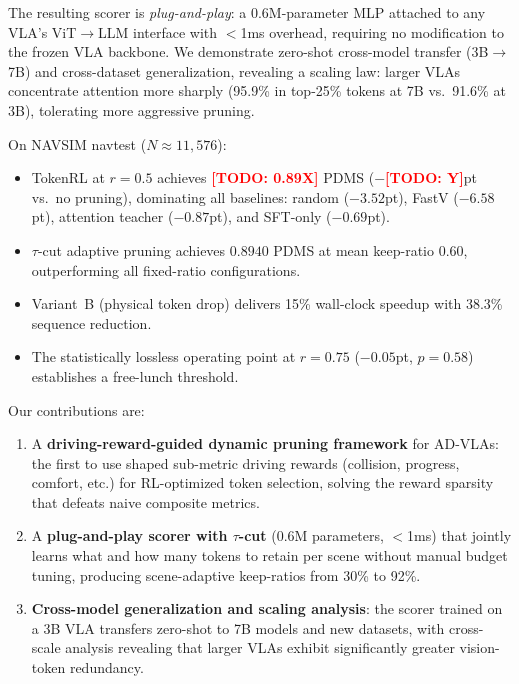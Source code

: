 \documentclass[letterpaper]{article} %
\newcommand{\ours}{TokenRL}
\newcommand{\todo}[1]{\textcolor{red}{\textbf{[TODO: #1]}}}
\begin{document}
The resulting scorer is \emph{plug-and-play}: a 0.6M-parameter MLP attached to any VLA's ViT$\to$LLM interface with $<$1ms overhead, requiring no modification to the frozen VLA backbone.
We demonstrate zero-shot cross-model transfer (3B$\to$7B) and cross-dataset generalization, revealing a scaling law: larger VLAs concentrate attention more sharply (95.9\% in top-25\% tokens at 7B vs.\ 91.6\% at 3B), tolerating more aggressive pruning.

On NAVSIM navtest ($N{\approx}11{,}576$):
\begin{itemize}[nosep,leftmargin=*]
\item \ours{} at $r{=}0.5$ achieves \todo{0.89X} PDMS ($-$\todo{Y}pt vs.\ no pruning), dominating all baselines: random ($-3.52$pt), FastV ($-6.58$pt), attention teacher ($-0.87$pt), and SFT-only ($-0.69$pt).
\item $\tau$-cut adaptive pruning achieves $0.8940$ PDMS at mean keep-ratio 0.60, outperforming all fixed-ratio configurations.
\item Variant~B (physical token drop) delivers 15\% wall-clock speedup with 38.3\% sequence reduction.
\item The statistically lossless operating point at $r{=}0.75$ ($-0.05$pt, $p{=}0.58$) establishes a free-lunch threshold.
\end{itemize}

Our contributions are:
\begin{enumerate}[nosep,leftmargin=*]
\item A \textbf{driving-reward-guided dynamic pruning framework} for AD-VLAs: the first to use shaped sub-metric driving rewards (collision, progress, comfort, etc.) for RL-optimized token selection, solving the reward sparsity that defeats naive composite metrics.
\item A \textbf{plug-and-play scorer with $\tau$-cut} (0.6M parameters, $<$1ms) that jointly learns what and how many tokens to retain per scene without manual budget tuning, producing scene-adaptive keep-ratios from 30\% to 92\%.
\item \textbf{Cross-model generalization and scaling analysis}: the scorer trained on a 3B VLA transfers zero-shot to 7B models and new datasets, with cross-scale analysis revealing that larger VLAs exhibit significantly greater vision-token redundancy.
\end{enumerate}

\end{document}
